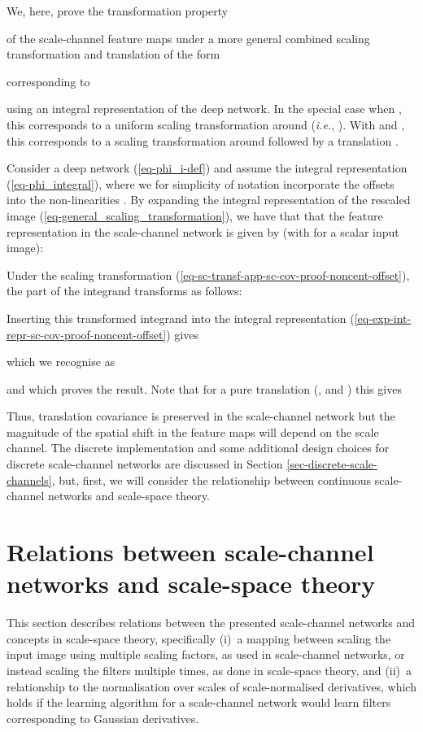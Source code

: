 \documentclass[twocolumn,runningheads]{svjour3}
\begin{document}
We, here, prove the transformation property 

of the scale-channel feature maps
under a more general combined scaling transformation and translation of the form

corresponding to

using an integral representation of the deep network.
In the special case when , this corresponds to a
uniform scaling transformation around  ({\em i.e.\/}, ). 
With  and , this
corresponds to a scaling transformation around  followed by a
translation . 

Consider a deep network  (\ref{eq-phi_i-def}) 
and assume the integral representation (\ref{eq-phi_integral}), 
where we for simplicity of notation incorporate the offsets  into the 
non-linearities . 
By expanding the integral representation 
of the rescaled image  (\ref{eq-general_scaling_transformation}),
we have that that the feature representation in the scale-channel network is given by
 (with  for a scalar input image):
 
 
Under the scaling transformation
(\ref{eq-sc-transf-app-sc-cov-proof-noncent-offset}), 
the part of the integrand 
 transforms as follows:

Inserting this transformed integrand into the integral representation 
(\ref{eq-exp-int-repr-sc-cov-proof-noncent-offset})
gives

which we recognise as

and which proves the result. Note that for a pure translation (,    and ) this gives

Thus, translation covariance is preserved in the scale-channel network
but the magnitude of the spatial shift in the feature maps will depend
on the scale channel. The discrete implementation and some additional design choices for discrete scale-channel networks are discussed in Section \ref{sec-discrete-scale-channels}, but, first, we will consider the relationship between continuous scale-channel networks and scale-space theory. 

\section{Relations between scale-channel networks and scale-space theory}
\label{sec-relations-scsp-theory}

This section describes relations between the presented scale-channel networks and concepts in scale-space theory, specifically (i)~a mapping between scaling the input image using multiple scaling factors, as used in scale-channel networks, or instead scaling the filters multiple times, as done in scale-space theory, and (ii)~a relationship to the normalisation over scales of scale-normalised derivatives, which holds if the learning algorithm for a scale-channel network would learn filters corresponding to Gaussian derivatives.
\end{document}
